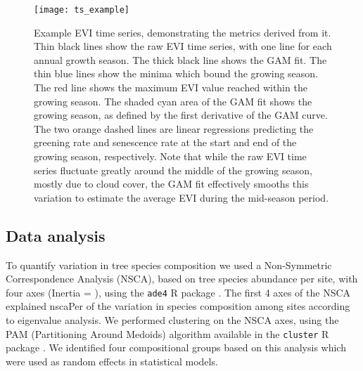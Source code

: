 \documentclass[11pt,a4paper]{article}
\begin{document}
\begin{figure}[h]
\centering
	\texttt{[image: ts\_example]}
	\caption{Example EVI time series, demonstrating the metrics derived from it. Thin black lines show the raw EVI time series, with one line for each annual growth season. The thick black line shows the GAM fit. The thin blue lines show the minima which bound the growing season. The red line shows the maximum EVI value reached within the growing season. The shaded cyan area of the GAM fit shows the growing season, as defined by the first derivative of the GAM curve. The two orange dashed lines are linear regressions predicting the greening rate and senescence rate at the start and end of the growing season, respectively. Note that while the raw EVI time series fluctuate greatly around the middle of the growing season, mostly due to cloud cover, the GAM fit effectively smooths this variation to estimate the average EVI during the mid-season period.}
	\label{ts_example}
\end{figure}

\subsection{Data analysis}

To quantify variation in tree species composition we used a Non-Symmetric Correspondence Analysis (NSCA), based on tree species abundance per site, with four axes (Inertia = \nscaInertia{}), using the \texttt{ade4} R package \citep{ade4}. The first 4 axes of the NSCA explained nscaPer{} of the variation in species composition among sites according to eigenvalue analysis. We performed clustering on the NSCA axes, using the PAM (Partitioning Around Medoids) algorithm available in the \texttt{cluster} R package \citep{cluster}. We identified four compositional groups based on this analysis which were used as random effects in statistical models. 
\end{document}
